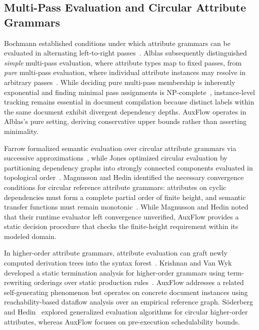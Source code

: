 \documentclass[conference]{IEEEtran}
\begin{document}
\subsection{Multi-Pass Evaluation and Circular Attribute Grammars}

Bochmann established conditions under which attribute grammars can be evaluated in alternating left-to-right passes~\cite{bochmann1976}. Alblas subsequently distinguished \emph{simple} multi-pass evaluation, where attribute types map to fixed passes, from \emph{pure} multi-pass evaluation, where individual attribute instances may resolve in arbitrary passes~\cite{alblas1981}. While deciding pure multi-pass membership is inherently exponential and finding minimal pass assignments is NP-complete~\cite{raiha1981}, instance-level tracking remains essential in document compilation because distinct labels within the same document exhibit divergent dependency depths. AuxFlow operates in Alblas's pure setting, deriving conservative upper bounds rather than asserting minimality.

Farrow formalized semantic evaluation over circular attribute grammars via successive approximations~\cite{farrow1986}, while Jones optimized circular evaluation by partitioning dependency graphs into strongly connected components evaluated in topological order~\cite{jones1990}. Magnusson and Hedin identified the necessary convergence conditions for circular reference attribute grammars: attributes on cyclic dependencies must form a complete partial order of finite height, and semantic transfer functions must remain monotonic~\cite{magnusson2007}. While Magnusson and Hedin noted that their runtime evaluator left convergence unverified, AuxFlow provides a static decision procedure that checks the finite-height requirement within its modeled domain.

In higher-order attribute grammars, attribute evaluation can graft newly computed derivation trees into the syntax forest~\cite{vogt1989}. Krishnan and Van Wyk developed a static termination analysis for higher-order grammars using term-rewriting orderings over static production rules~\cite{krishnan2012}. AuxFlow addresses a related self-generating phenomenon but operates on concrete document instances using reachability-based dataflow analysis over an empirical reference graph. S\"oderberg and Hedin~\cite{soderberg2013} explored generalized evaluation algorithms for circular higher-order attributes, whereas AuxFlow focuses on pre-execution schedulability bounds.
\end{document}

